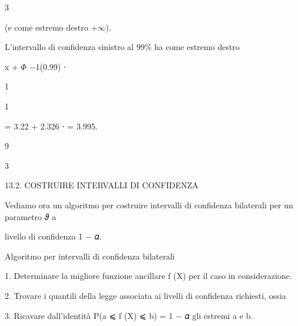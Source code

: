 \documentclass[a4paper,portrait,12pt]{article}
\begin{document}
3





\begin{flushleft}
(e come estremo destro +$\infty$).
\end{flushleft}


\begin{flushleft}
L'intervallo di confidenza sinistro al 99\% ha come estremo destro
\end{flushleft}


\begin{flushleft}
x + $\Phi$ $-$1(0.99) ⋅
\end{flushleft}





1


1


= 3.22 + 2.326 ⋅ = 3.995.


9


3





\begin{flushleft}
13.2. COSTRUIRE INTERVALLI DI CONFIDENZA
\end{flushleft}


\begin{flushleft}
Vediamo ora un algoritmo per costruire intervalli di confidenza bilaterali per un parametro 𝜗 a
\end{flushleft}


\begin{flushleft}
livello di confidenza 1 $-$ 𝛼.
\end{flushleft}


\begin{flushleft}
Algoritmo per intervalli di confidenza bilaterali
\end{flushleft}


\begin{flushleft}
1. Determinare la migliore funzione ancillare f (X) per il caso in considerazione.
\end{flushleft}


\begin{flushleft}
2. Trovare i quantili della legge associata ai livelli di confidenza richiesti, ossia
\end{flushleft}


\begin{flushleft}
3. Ricavare dall'identit\`{a} P(a ⩽ f (X) ⩽ b) = 1 $-$ 𝛼 gli estremi a e b.
\end{flushleft}
\end{document}
